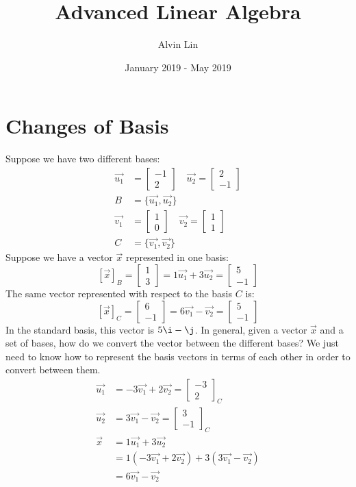 \documentclass{math}
\title{Advanced Linear Algebra}
\author{Alvin Lin}
\date{January 2019 - May 2019}
\begin{document}
\maketitle

\section*{Changes of Basis}
Suppose we have two different bases:
\begin{align*}
  \vec{u_1} &= \begin{bmatrix}-1 \\ 2\end{bmatrix} \quad
    \vec{u_2} = \begin{bmatrix}2 \\ -1\end{bmatrix} \\
  B &= \{\vec{u_1},\vec{u_2}\} \\
  \vec{v_1} &= \begin{bmatrix}1 \\ 0\end{bmatrix} \quad
    \vec{v_2} = \begin{bmatrix}1 \\ 1\end{bmatrix} \\
  C &= \{\vec{v_1},\vec{v_2}\}
\end{align*}
Suppose we have a vector \( \vec{x} \) represented in one basis:
\[ [\vec{x}]_{B} = \begin{bmatrix}1 \\ 3\end{bmatrix} =
  1\vec{u_1}+3\vec{u_2} = \begin{bmatrix}5 \\ -1\end{bmatrix} \]
The same vector represented with respect to the basis \( C \) is:
\[ [\vec{x}]_{C} = \begin{bmatrix}6 \\ -1\end{bmatrix} =
  6\vec{v_1}-\vec{v_2} = \begin{bmatrix}5 \\ -1\end{bmatrix} \]
In the standard basis, this vector is \( 5\i-\j \). In general, given a vector
\( \vec{x} \) and a set of bases, how do we convert the vector between the
different bases? We just need to know how to represent the basis vectors in
terms of each other in order to convert between them.
\begin{align*}
  \vec{u_1} &= -3\vec{v_1}+2\vec{v_2} = \begin{bmatrix}-3 \\ 2\end{bmatrix}_C \\
  \vec{u_2} &= 3\vec{v_1}-\vec{v_2} = \begin{bmatrix}3 \\ -1\end{bmatrix}_C \\
  \vec{x} &= 1\vec{u_1}+3\vec{u_2} \\
  &= 1(-3\vec{v_1}+2\vec{v_2})+3(3\vec{v_1}-\vec{v_2}) \\
  &= 6\vec{v_1}-\vec{v_2}
\end{align*}
\end{document}
